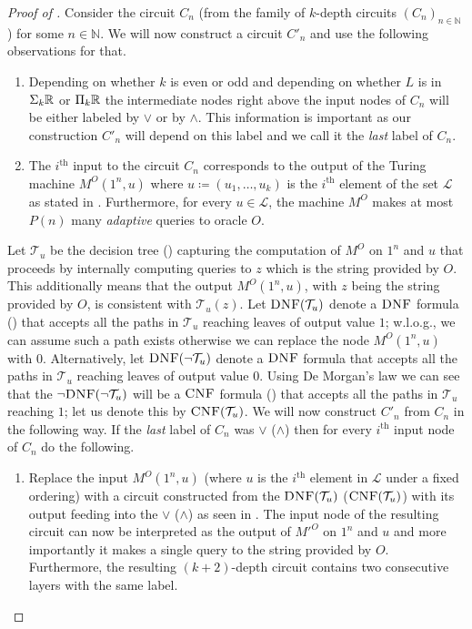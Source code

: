 \documentclass{article}
\begin{document}
\begin{proof}[Proof of ]
Consider the circuit $C_n$ (from the family of $k$-depth circuits $(C_n)_{n \in \mathbb{N}}$) for some $n \in \mathbb{N}$. We will now construct a circuit $C'_n$ and use the following observations for that.
\begin{enumerate}
\item Depending on whether $k$ is even or odd and depending on whether $L$ is in $\Sigma_{k}\mathbb{R}$ or $\Pi_{k}\mathbb{R}$ the intermediate nodes right above the input nodes of $C_n$ will be either labeled by $\lor$ or by $\land$. This information is important as our construction $C'_n$ will depend on this label and we call it the \emph{last} label of $C_n$.
\item The $i^\text{th}$ input to the circuit $C_n$ corresponds to the output of the Turing machine $M^O(1^n, u)$ where $u \coloneqq (u_1, \ldots, u_k)$ is the $i^\text{th}$ element of the set $\mathcal{L}$ as stated in . Furthermore, for every $u \in \mathcal{L}$, the machine $M^{O}$ makes at most $P(n)$ many \emph{adaptive} queries to oracle $O$.
\end{enumerate}
Let $\mathcal{T}_u$ be the decision tree () capturing the computation of $M^{O}$ on $1^n$ and $u$ that proceeds by internally computing queries to $z$ which is the string provided by $O$. This additionally means that the output $M^O(1^n, u)$, with $z$ being the string provided by $O$, is consistent with $\mathcal{T}_u(z)$. Let $\textsc{DNF}(\mathcal{T}_u)$ denote a $\textsc{DNF}$ formula () that accepts all the paths in $\mathcal{T}_u$ reaching leaves of output value $1$; w.l.o.g., we can assume such a path exists otherwise we can replace the node $M^O(1^n, u)$ with $0$. Alternatively, let $\textsc{DNF}(\neg \mathcal{T}_u)$ denote a $\textsc{DNF}$ formula that accepts all the paths in $\mathcal{T}_u$ reaching leaves of output value $0$. Using De Morgan's law we can see that the $\neg \textsc{DNF}(\neg \mathcal{T}_u)$ will be a $\textsc{CNF}$ formula () that accepts all the paths in $\mathcal{T}_u$ reaching $1$; let us denote this by $\textsc{CNF}(\mathcal{T}_u)$. We will now construct $C'_n$ from $C_n$ in the following way. If the \emph{last} label of $C_n$ was $\lor$ ($\land$) then for every $i^{\text{th}}$ input node of $C_n$ do the following.
\begin{enumerate}
    \item Replace the input $M^O(1^n, u)$ (where $u$ is the $i^\text{th}$ element in $\mathcal{L}$ under a fixed ordering) with a circuit constructed from the $\textsc{DNF}(\mathcal{T}_u)$ ($\textsc{CNF}(\mathcal{T}_u)$) with its output feeding into the $\lor$ ($\land$) as seen in . The input node of the resulting circuit can now be interpreted as the output of $M'^{O}$ on $1^n$ and $u$ and more importantly it makes a single query to the string provided by $O$. Furthermore, the resulting $(k+2)$-depth circuit contains two consecutive layers with the same label.

\end{enumerate}
\end{proof}
\end{document}
